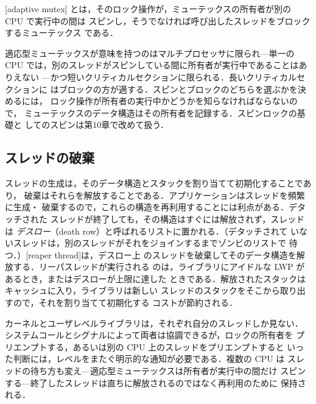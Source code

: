 \documentclass[../main.tex]{subfiles}
\begin{document}
\begin{definition}[適応型ミューテックス]
  [adaptive mutex]%
  とは，そのロック操作が，ミューテックスの所有者が別の CPU で実行中の間は
  スピンし，そうでなければ呼び出したスレッドをブロックするミューテックス
  である．
\end{definition}

適応型ミューテックスが意味を持つのはマルチプロセッサに限られ---単一の CPU
では，別のスレッドがスピンしている間に所有者が実行中であることはありえない
---かつ短いクリティカルセクションに限られる．長いクリティカルセクションに
はブロックの方が適する．スピンとブロックのどちらを選ぶかを決めるには，
ロック操作が所有者の実行中かどうかを知らなければならないので，
ミューテックスのデータ構造はその所有者を記録する．スピンロックの基礎と
してのスピンは第10章で改めて扱う．

\subsection{スレッドの破棄}

スレッドの生成は，そのデータ構造とスタックを割り当てて初期化することであり，
破棄はそれらを解放することである．アプリケーションはスレッドを頻繁に生成・
破棄するので，これらの構造を再利用することには利点がある．デタッチされた
スレッドが終了しても，その構造はすぐには解放されず，スレッドは
\emph{デスロー}（death row）と呼ばれるリストに置かれる．（デタッチされて
いないスレッドは，別のスレッドがそれをジョインするまでゾンビのリストで
待つ．）[reaper thread]は，デスロー上
のスレッドを破棄してそのデータ構造を解放する．リーパスレッドが実行される
のは，ライブラリにアイドルな LWP があるとき，またはデスローが上限に達した
ときである．解放されたスタックはキャッシュに入り，ライブラリは新しい
スレッドのスタックをそこから取り出すので，それを割り当てて初期化する
コストが節約される．

\begin{keypoint}
  カーネルとユーザレベルライブラリは，それぞれ自分のスレッドしか見ない．
  システムコールとシグナルによって両者は協調できるが，ロックの所有者を
  プリエンプトする，あるいは別の CPU 上のスレッドをプリエンプトすると
  いった判断には，レベルをまたぐ明示的な通知が必要である．複数の CPU は
  スレッドの待ち方も変え---適応型ミューテックスは所有者が実行中の間だけ
  スピンする---終了したスレッドは直ちに解放されるのではなく再利用のために
  保持される．
\end{keypoint}
\end{document}
